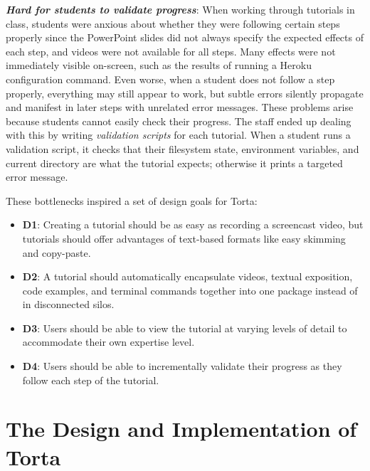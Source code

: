 \textbf{\emph{Hard for students to validate progress}}: When working
through tutorials in class, students were anxious about whether they
were following certain steps properly since the PowerPoint slides did
not always specify the expected effects of each step, and videos were
not available for all steps. Many effects were not immediately
visible on-screen, such as the results of running a Heroku configuration
command. Even worse, when a student does not follow a step properly,
everything may still appear to work, but subtle errors silently
propagate and manifest in later steps with unrelated error messages.
These problems arise because students cannot easily check their
progress. The staff ended up dealing with this by writing
\emph{validation scripts} for each tutorial. When a student runs a
validation script, it checks that their filesystem state, environment
variables, and current directory are what the tutorial expects;
otherwise it prints a targeted error message.

These bottlenecks inspired a set of design goals for Torta:

\begin{itemize}\itemsep0pt

\item \textbf{D1}: Creating a tutorial should be as easy as recording a
screencast video, but tutorials should offer advantages of text-based
formats like easy skimming and copy-paste.

\item \textbf{D2}: A tutorial should automatically encapsulate videos,
textual exposition, code examples, and terminal commands together into
one package instead of in disconnected silos.

\item \textbf{D3}: Users should be able to view the tutorial at
varying levels of detail to accommodate their own expertise level.

\item \textbf{D4}: Users should be able to incrementally validate their progress
as they follow each step of the tutorial.

\end{itemize}


\section{The Design and Implementation of Torta}

